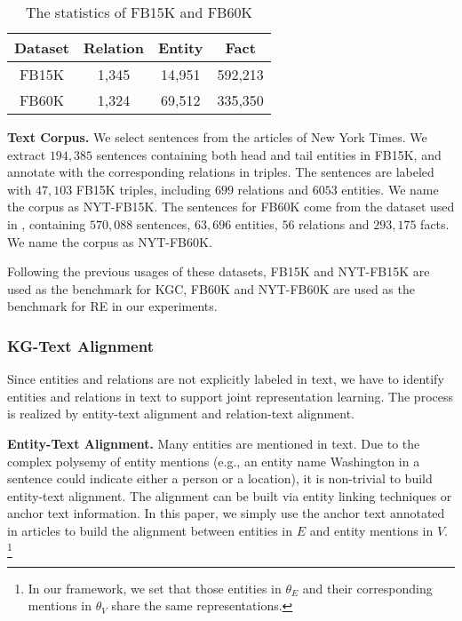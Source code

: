 \documentclass[letterpaper]{article} %
\begin{document}
\begin{table}[htb]
\centering
\small
\begin{tabular}{|c|c|c|c|}
\hline
Dataset & \textbf{Relation} & \textbf{Entity} & \textbf{Fact} \\ \hline
FB15K   & 1,345           & 14,951            & 592,213 \\ \hline
FB60K   & 1,324           & 69,512            & 335,350 \\ \hline
\end{tabular}
\caption{The statistics of FB15K and FB60K}
\label{tab:statistics-of-FB15K}
\end{table}

\textbf{Text Corpus.} We select sentences from the articles of New York Times. We extract $194,385$ sentences containing both head and tail entities in FB15K, and annotate with the corresponding relations in triples. The sentences are labeled with $47,103$ FB15K triples, including $699$ relations and $6053$ entities. We name the corpus as NYT-FB15K. The sentences for FB60K come from the dataset used in \cite{riedel2010modeling}, containing $570,088$ sentences, $63,696$ entities, $56$ relations and $293,175$ facts. We name the corpus as NYT-FB60K.
 
Following the previous usages of these datasets, FB15K and NYT-FB15K are used as the benchmark for KGC, FB60K and NYT-FB60K are used as the benchmark for RE in our experiments.


\subsubsection{KG-Text Alignment}
\label{sec:alignment}

Since entities and relations are not explicitly labeled in text, we have to identify entities and relations in text to support joint representation learning. The process is realized by entity-text alignment and relation-text alignment.

\textbf{Entity-Text Alignment.} Many entities are mentioned in text. Due to the complex polysemy of entity mentions (e.g., an entity name Washington in a sentence could indicate either a person or a location), it is non-trivial to build entity-text alignment. The alignment can be built via entity linking techniques or anchor text information. In this paper, we simply use the anchor text annotated in articles to build the alignment between entities in $E$ and entity mentions in $V$. \footnote{In our framework, we set that those entities in $\theta_E$ and their corresponding mentions in $\theta_V$ share the same representations.}
\end{document}
